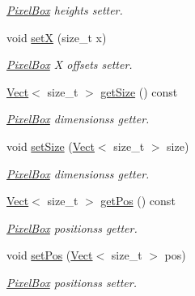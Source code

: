 \begin{DoxyCompactItemize}
\begin{DoxyCompactList}\small\item\em \hyperlink{class_arcade_1_1_pixel_box}{Pixel\+Box} height\textquotesingle{}s setter. \end{DoxyCompactList}\item 
\mbox{\label{class_arcade_1_1_pixel_box_a6c184f4d988c76cabe7bd50be6e8f667}} 
void \hyperlink{class_arcade_1_1_pixel_box_a6c184f4d988c76cabe7bd50be6e8f667}{setX} (size\+\_\+t x)
\begin{DoxyCompactList}\small\item\em \hyperlink{class_arcade_1_1_pixel_box}{Pixel\+Box} X offset\textquotesingle{}s setter. \end{DoxyCompactList}\item 
\hyperlink{class_arcade_1_1_vect}{Vect}$<$ size\+\_\+t $>$ \hyperlink{class_arcade_1_1_pixel_box_a8f0280a28955151ee0662b206779d06d}{get\+Size} () const
\begin{DoxyCompactList}\small\item\em \hyperlink{class_arcade_1_1_pixel_box}{Pixel\+Box} dimensions\textquotesingle{}s getter. \end{DoxyCompactList}\item 
void \hyperlink{class_arcade_1_1_pixel_box_ad0682049ca567f2a963528d1d5d8c62b}{set\+Size} (\hyperlink{class_arcade_1_1_vect}{Vect}$<$ size\+\_\+t $>$ size)
\begin{DoxyCompactList}\small\item\em \hyperlink{class_arcade_1_1_pixel_box}{Pixel\+Box} dimensions\textquotesingle{}s getter. \end{DoxyCompactList}\item 
\hyperlink{class_arcade_1_1_vect}{Vect}$<$ size\+\_\+t $>$ \hyperlink{class_arcade_1_1_pixel_box_af041604dd9b7b39a82671b00e445ee0e}{get\+Pos} () const
\begin{DoxyCompactList}\small\item\em \hyperlink{class_arcade_1_1_pixel_box}{Pixel\+Box} positions\textquotesingle{}s getter. \end{DoxyCompactList}\item 
void \hyperlink{class_arcade_1_1_pixel_box_aeb1ca87a35942dc55f129d9de480658b}{set\+Pos} (\hyperlink{class_arcade_1_1_vect}{Vect}$<$ size\+\_\+t $>$ pos)
\begin{DoxyCompactList}\small\item\em \hyperlink{class_arcade_1_1_pixel_box}{Pixel\+Box} positions\textquotesingle{}s setter. \end{DoxyCompactList}\item 

\end{DoxyCompactItemize}

